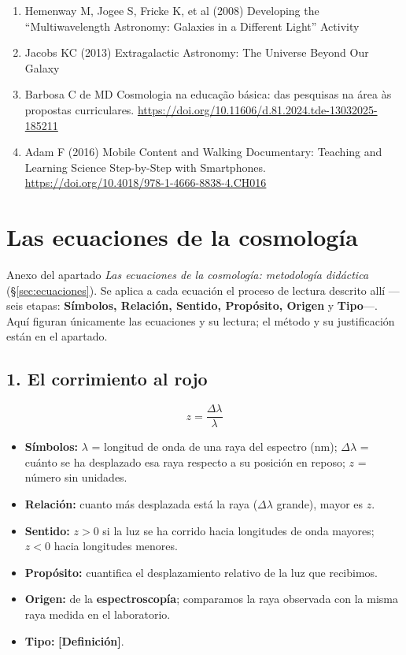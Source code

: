 {\begin{enumerate}
\item Hemenway M, Jogee S, Fricke K, et al (2008) Developing the ``Multiwavelength Astronomy: Galaxies in a Different Light'' Activity
\item Jacobs KC (2013) Extragalactic Astronomy: The Universe Beyond Our Galaxy
\item Barbosa C de MD Cosmologia na educação básica: das pesquisas na área às propostas curriculares. \url{https://doi.org/10.11606/d.81.2024.tde-13032025-185211}
\item Adam F (2016) Mobile Content and Walking Documentary: Teaching and Learning Science Step-by-Step with Smartphones. \url{https://doi.org/10.4018/978-1-4666-8838-4.CH016}
\end{enumerate}
}

\chapter{Las ecuaciones de la cosmología}\label{cap:anexo-ecuaciones}

Anexo del apartado \emph{Las ecuaciones de la cosmología: metodología didáctica} (\S\ref{sec:ecuaciones}). Se aplica a cada ecuación el proceso de lectura descrito allí ---seis etapas: \textbf{Símbolos, Relación, Sentido, Propósito, Origen} y \textbf{Tipo}---. Aquí figuran únicamente las ecuaciones y su lectura; el método y su justificación están en el apartado.

\section*{1. El corrimiento al rojo}

\[ z=\frac{\Delta\lambda}{\lambda} \]

\begin{itemize}
  \item \textbf{Símbolos:} $\lambda$ = longitud de onda de una raya del espectro (nm); $\Delta\lambda$ = cuánto se ha desplazado esa raya respecto a su posición en reposo; $z$ = número sin unidades.
  \item \textbf{Relación:} cuanto más desplazada está la raya ($\Delta\lambda$ grande), mayor es $z$.
  \item \textbf{Sentido:} $z>0$ si la luz se ha corrido hacia longitudes de onda mayores; $z<0$ hacia longitudes menores.
  \item \textbf{Propósito:} cuantifica el desplazamiento relativo de la luz que recibimos.
  \item \textbf{Origen:} de la \textbf{espectroscopía}; comparamos la raya observada con la misma raya medida en el laboratorio.
  \item \textbf{Tipo:} \textbf{[Definición]}.
\end{itemize}

